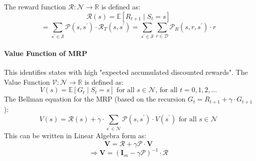\documentclass[11pt]{article}
\begin{document}
The reward function $\mathcal{R}: \mathcal{N}\rightarrow\mathbb{R}$ is defined as:
$$
\mathcal{R}(s)=\mathbb{E}\left[R_{t+1} \mid S_t=s\right]
$$
$$
=\sum_{s^{\prime} \in \mathcal{S}} \mathcal{P}\left(s, s^{\prime}\right) \cdot \mathcal{R}_T\left(s, s^{\prime}\right)=\sum_{s^{\prime} \in \mathcal{S}} \sum_{r \in \mathcal{D}} \mathcal{P}_R\left(s, r, s^{\prime}\right) \cdot r
$$

\paragraph*{Value Function of MRP}
This identifies states with high "expected accumulated discounted rewards".
The Value Function $\mathcal{V}: \mathcal{N}\rightarrow\mathbb{R}$ is defined as:
$$
V(s)=\mathbb{E}\left[G_t \mid S_t=s\right] \text { for all } s \in \mathcal{N} \text {, for all } t=0,1,2, \ldots
$$
The Bellman equation for the MRP (based on the recursion $G_t = R_{t+1}+\gamma \cdot G_{t+1}$):
$$
V(s)=\mathcal{R}(s)+\gamma \cdot \sum_{s^{\prime} \in \mathcal{N}} \mathcal{P}\left(s, s^{\prime}\right) \cdot V\left(s^{\prime}\right) \text { for all } s \in \mathcal{N}
$$
This can be written in Linear Algebra form as:
$$
\mathbf{V} =\boldsymbol{\mathcal{R}}+\gamma \boldsymbol{\mathcal{P}} \cdot \mathbf{V} 
$$
$$
\Rightarrow \mathbf{V}=\left(\mathbf{I}_m-\gamma \boldsymbol{\mathcal{P}}\right)^{-1} \cdot \boldsymbol{\mathcal{R}}
$$
\end{document}
